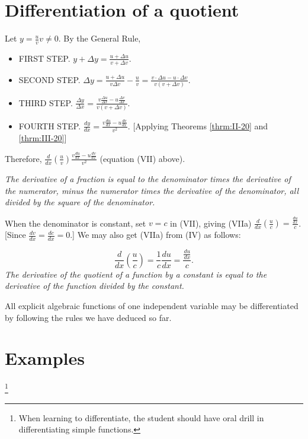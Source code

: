 \section{Differentiation of a quotient}

Let $y 	= \frac{u}{v} 	v \ne 0$.
By the General Rule,

\begin{itemize}
\item
FIRST STEP. $y + \Delta y 	= \frac{u + \Delta u}{v + \Delta v}$.
\item
SECOND STEP. $\Delta y 	= \frac{u + \Delta u}{v \Delta v} - \frac{u}{v} = \frac{v \cdot \Delta u - u \cdot \Delta v}{v(v + \Delta v)}$.
\item
THIRD STEP. $\frac{\Delta y}{\Delta x} 	= \frac{v\frac{\Delta u}{\Delta x} - u\frac{\Delta v}{\Delta x}}{v(v + \Delta v)}$.
\item
FOURTH STEP. $\frac{dy}{dx} 	= \frac{v\frac{du}{dx} - u\frac{dv}{dx}}{v^2}$.
[Applying Theorems \ref{thrm:II-20} and \ref{thrm:III-20}]
\end{itemize}
Therefore, 
$\frac{d}{dx} \left ( \frac{u}{v} \right ) 
\frac{v\frac{du}{dx} - u\frac{dv}{dx}}{v^2}$
(equation (VII) above). %

{\it The derivative of a fraction is equal to the denominator 
times the derivative of the numerator, minus the numerator 
times the derivative of the denominator, all divided by the 
square of the denominator.}

When the denominator is constant, set $v = c$ in (VII), giving
(VIIa)
$\frac{d}{dx} \left ( \frac{u}{c} \right ) 	
= \frac{\frac{du}{dx}}{c}$.
[Since $\frac{dv}{dx} = \frac{dc}{dx} = 0$.]
We may also get (VIIa) from (IV) as follows:

\[
\frac{d}{dx} \left ( \frac{u}{c} \right ) 	
= \frac{1}{c} \frac{du}{dx} = \frac{\frac{du}{dx}}{c}.
\]
{\it The derivative of the quotient of a function by a constant 
is equal to the derivative of the function divided by the constant.}

All explicit algebraic functions of one independent variable 
may be differentiated by following the rules we have deduced so far.

\section{Examples}\footnote{When learning to differentiate, 
the student should have oral drill in differentiating simple functions.}

